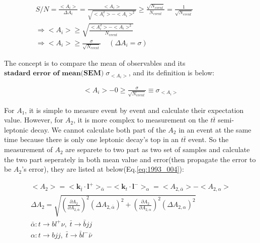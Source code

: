 			\begin{equation}
			\begin{split} 
			S/N = \frac{<A_i>}{\Delta A_i} = \frac{<A_i>}{\sqrt{<A_i^2>-<A_i>^2}} \geq \frac{\sqrt{N_{event}}}{N_{event}} = \frac{1}{\sqrt{N_{event}}} \\
			\Rightarrow <A_i> \geq \sqrt{ \frac{<A_i^2>-<A_i>^2}{N_{event}} } \;\;\;\;\;\;\;\;\;\;\;\;\;\;\;\;\;\;\;\;\;\;\;\;\;\;\;\;\;\;\;\;\;\;\;\;\;\;\;\;\\
			\Rightarrow <A_i> \geq \frac{\sigma}{\sqrt{N_{event}}} \;\;\;\;(\Delta A_i = \sigma)\;\;\;\;\;\;\;\;\;\;\;\;\;\;\;\;\;\;\;\;\;\;\;\;\;\;\;\;\;\;\;\;\;\;\;\;\;\;\;\;
			\end{split}
			\label{eq:signal_noise}
			\end{equation}

			The concept is to compare the mean of observables and its $\textbf{stadard error of mean(SEM)}\; \sigma_{<A_{i}>}$, and its definition is below:

			\begin{equation}
			\begin{split} 
			 <A_i> - 0 \geq \frac{\sigma}{\sqrt{N_{event}}} \equiv \sigma_{<A_i>} 
			\end{split}
			\label{eq:signal_noise_2}
			\end{equation}

			For $A_1$, it is simple to measure event by event and calculate their expectation value. However, for $A_2$, it is more complex to measurement on the $t\bar{t}$ semi-leptonic decay. We cannot calculate both part of the $A_2$ in an event at the same time because there is only one leptonic decay's top in an $t\bar{t}$ event. So the measurement of $A_2$ are separete to two part as two set of samples and calculate the two part seperately in both mean value and error(then propagate the error to be $A_2$'s error), they are listed at below(Eq.\ref{eq:1993_004}):

			\begin{equation}
			\begin{split} 
			<A_2> = <\textbf{k}_{\bar{t}} \cdot \textbf{l}^+>_{\bar{\alpha}} - <\textbf{k}_t \cdot \textbf{l}^->_{\alpha} = <A_{2,\bar{\alpha}}> - <A_{2,\alpha}>\\
			\Delta A_2 = \sqrt{(\frac{\partial A_2}{\partial A_{2,\bar{\alpha}}})^2 (\Delta A_{2,\bar{\alpha}})^2 + (\frac{\partial A_2}{\partial A_{2,\alpha}})^2 (\Delta A_{2,\alpha})^2} \;\;\;\;\;\;\;\;\;\;\;\;\;\;\;\;\;\\
			\bar{\alpha} : t\rightarrow bl^+\nu,\; \bar{t}\rightarrow \bar{b}jj   \;\;\;\;\;\;\;\;\;\;\;\;\;\;\;\;\;\;\;\;\;\;\;\;\;\;\;\;\;\;\;\;\;\;\;\;\;\;\;\;\;\;\;\;\;\;\;\;\;\;\;\;\;\;\;\; \\
			\alpha : t\rightarrow bjj,\; \bar{t}\rightarrow \bar{b} l^- \bar{\nu} \;\;\;\;\;\;\;\;\;\;\;\;\;\;\;\;\;\;\;\;\;\;\;\;\;\;\;\;\;\;\;\;\;\;\;\;\;\;\;\;\;\;\;\;\;\;\;\;\;\;\;\;\;\;\;\;
			\end{split}
			\label{eq:1993_004}
			\end{equation}

